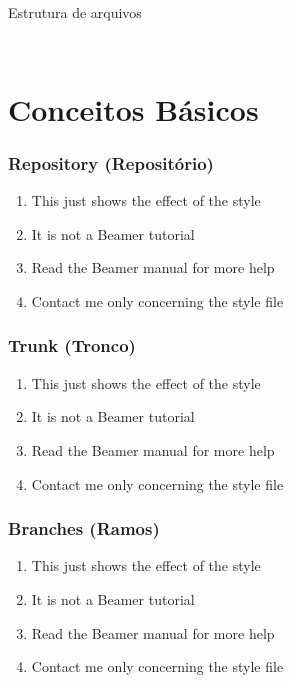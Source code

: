 \documentclass{beamer}
\begin{document}
\begin{frame}
\begin{columns}
\begin{column}{.5\textwidth}
\begin{block}{Estrutura de arquivos}
\begin{columns}
\begin{column}{.5\textwidth}
\begin{figure}
                        \end{figure}
                    \end{column}
                \end{columns}
            \end{block}
        \end{column}
    \end{columns}
\end{frame}



\section{Conceitos B\'asicos}

\begin{frame}
    \frametitle{Repository (Reposit\'orio)}

    \begin{enumerate}
        \item This just shows the effect of the style
        \item It is not a Beamer tutorial
        \item Read the Beamer manual for more help
        \item Contact me only concerning the style file
    \end{enumerate}
\end{frame}

\begin{frame}
    \frametitle{Trunk (Tronco)}

    \begin{enumerate}
        \item This just shows the effect of the style
        \item It is not a Beamer tutorial
        \item Read the Beamer manual for more help
        \item Contact me only concerning the style file
    \end{enumerate}
\end{frame}

\begin{frame}
    \frametitle{Branches (Ramos)}

    \begin{enumerate}
        \item This just shows the effect of the style
        \item It is not a Beamer tutorial
        \item Read the Beamer manual for more help
        \item Contact me only concerning the style file
    \end{enumerate}
\end{frame}
\end{document}
